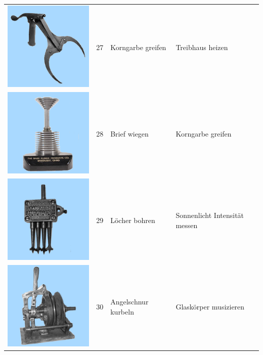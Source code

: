 \documentclass[
  english,
  man,floatsintext]{apa7}
\begin{document}
\begin{center}
\begin{ThreePartTable}
\begin{longtable}{llll}
\includegraphics[valign=c, scale=0.19]{../materials/unfamiliar/27.png} & 27 & Korngarbe greifen & Treibhaus heizen\\
\includegraphics[valign=c, scale=0.19]{../materials/unfamiliar/28.png} & 28 & Brief wiegen & Korngarbe greifen\\
\includegraphics[valign=c, scale=0.19]{../materials/unfamiliar/29.png} & 29 & Löcher bohren & Sonnenlicht Intensität messen\\
\includegraphics[valign=c, scale=0.19]{../materials/unfamiliar/30.png} & 30 & Angelschnur kurbeln & Glaskörper musizieren\\

\end{longtable}
\end{ThreePartTable}
\end{center}
\end{document}
